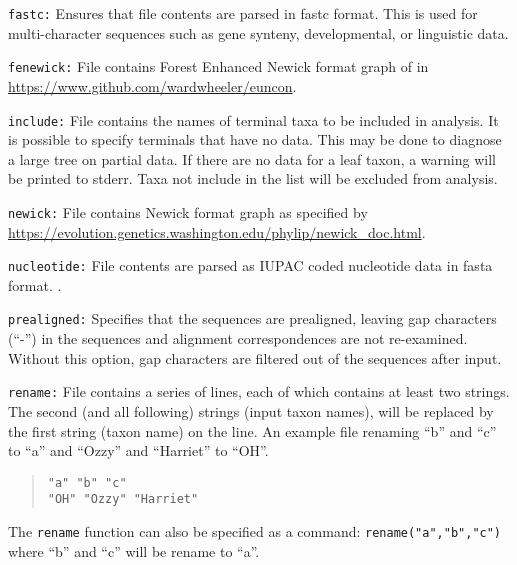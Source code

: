 \documentclass[11pt]{article}
\begin{document}
			\smallskip		
			\noindent \texttt{fastc:} Ensures that file contents are parsed in fastc \citep{WheelerandWashburn2019} format. This is used for multi-character sequences such as gene synteny, developmental,  or linguistic  data.
			
			\smallskip		
			\noindent \texttt{fenewick:}  File contains Forest Enhanced Newick format graph of \cite{Wheeler2021a} in \url{https://www.github.com/wardwheeler/euncon}.
			
			\smallskip		
			\noindent \texttt{include:}  File contains the names of terminal taxa to be included in analysis.  It is possible to specify terminals that have no data.  This may be done to diagnose a large tree on partial data.  If there are no data for a leaf taxon, a warning will be printed to stderr.  Taxa not include in the list will be excluded from analysis. 
			
			\smallskip		
			\noindent \texttt{newick:} File contains  Newick format graph as specified by \url{https://evolution.genetics.washington.edu/phylip/newick_doc.html}.
			
			\smallskip		
			\noindent \texttt{nucleotide:} File contents are parsed as IUPAC coded nucleotide data in fasta \citep{PearsonandLipman1988} format. .
			
			\smallskip		
			\noindent \texttt{prealigned:} Specifies that the sequences are prealigned, leaving gap characters
			(``-'') in the sequences and alignment correspondences are not re-examined. Without this option,
			gap characters are filtered out of the sequences after input.
			
			\smallskip		
			\noindent \texttt{rename:} File contains a series of lines, each of which contains at least two strings.  The second (and all following) strings (input taxon names),
			will be replaced by the first string (taxon name) on the line. An example file renaming ``b'' and ``c''  to ``a'' and ``Ozzy'' and ``Harriet'' to ``OH''.
				\begin{quote}
				\texttt{"a" "b" "c"}\\
				\texttt{"OH" "Ozzy" "Harriet"}
			\end{quote}
		
			 The \texttt{rename} function can also be specified as a command:  \texttt{rename("a","b","c")} where ``b'' and ``c'' will be rename to ``a''. 
			 
\end{document}
